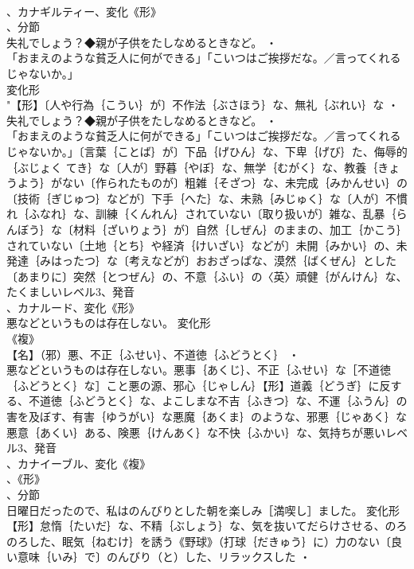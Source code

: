 \documentclass[8pt]{extreport}
\begin{document}
\begin{CJK}{UTF8}{min}
\\	、カナギルティー、変化《形》
\\	、分節
\\	失礼でしょう？◆親が子供をたしなめるときなど。 ・
\\	「おまえのような貧乏人に何ができる」「こいつはご挨拶だな。／言ってくれるじゃないか。」
\\	変化形 
\\	"【形】〔人や行為｛こうい｝が〕不作法｛ぶさほう｝な、無礼｛ぶれい｝な ・
\\	失礼でしょう？◆親が子供をたしなめるときなど。 ・
\\	「おまえのような貧乏人に何ができる」「こいつはご挨拶だな。／言ってくれるじゃないか。」〔言葉｛ことば｝が〕下品｛げひん｝な、下卑｛げび｝た、侮辱的｛ぶじょく てき｝な〔人が〕野暮｛やぼ｝な、無学｛むがく｝な、教養｛きょうよう｝がない〔作られたものが〕粗雑｛そざつ｝な、未完成｛みかんせい｝の〔技術｛ぎじゅつ｝などが〕下手｛へた｝な、未熟｛みじゅく｝な〔人が〕不慣れ｛ふなれ｝な、訓練｛くんれん｝されていない〔取り扱いが〕雑な、乱暴｛らんぼう｝な〔材料｛ざいりょう｝が〕自然｛しぜん｝のままの、加工｛かこう｝されていない〔土地｛とち｝や経済｛けいざい｝などが〕未開｛みかい｝の、未発達｛みはったつ｝な〔考えなどが〕おおざっぱな、漠然｛ばくぜん｝とした〔あまりに〕突然｛とつぜん｝の、不意｛ふい｝の〈英〉頑健｛がんけん｝な、たくましいレベル3、発音
\\	、カナルード、変化《形》
\\	悪などというものは存在しない。	変化形 
\\	《複》
\\	【名】（邪）悪、不正｛ふせい｝、不道徳｛ふどうとく｝ ・
\\	悪などというものは存在しない。悪事｛あくじ｝、不正｛ふせい｝な［不道徳｛ふどうとく｝な］こと悪の源、邪心｛じゃしん｝【形】道義｛どうぎ｝に反する、不道徳｛ふどうとく｝な、よこしまな不吉｛ふきつ｝な、不運｛ふうん｝の害を及ぼす、有害｛ゆうがい｝な悪魔｛あくま｝のような、邪悪｛じゃあく｝な悪意｛あくい｝ある、険悪｛けんあく｝な不快｛ふかい｝な、気持ちが悪いレベル3、発音
\\	、カナイーブル、変化《複》
\\	、《形》
\\	、分節
\\	日曜日だったので、私はのんびりとした朝を楽しみ［満喫し］ました。	変化形 
\\	【形】怠惰｛たいだ｝な、不精｛ぶしょう｝な、気を抜いてだらけさせる、のろのろした、眠気｛ねむけ｝を誘う《野球》（打球｛だきゅう｝に）力のない〔良い意味｛いみ｝で〕のんびり（と）した、リラックスした ・

\end{CJK}
\end{document}
